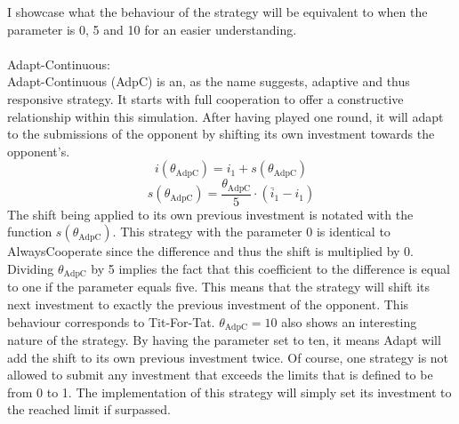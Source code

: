 \documentclass{article}
\begin{document}
\begin{itemize}
I showcase what the behaviour of the strategy will be equivalent to when the parameter is 0, 5 and 10 for an easier understanding.\\
		\\Adapt-Continuous:\\
Adapt-Continuous (AdpC) is an, as the name suggests, adaptive and thus responsive strategy.
It starts with full cooperation to offer a constructive relationship within this simulation.
After having played one round, it will adapt to the submissions of the opponent by shifting its own investment towards the opponent's.
$$i(\theta_{\mathrm{AdpC}}) = i_1 + s(\theta_{\mathrm{AdpC}})$$
$$s(\theta_{\mathrm{AdpC}}) = \frac{\theta_{\mathrm{AdpC}}}{5} \cdot (\bar i_1 - i_1)$$
The shift being applied to its own previous investment is notated with the function $s(\theta_{\mathrm{AdpC}})$.
This strategy with the parameter 0 is identical to AlwaysCooperate since the difference and thus the shift is multiplied by 0.
Dividing $\theta_{\mathrm{AdpC}}$ by 5 implies the fact that this coefficient to the difference is equal to one if the parameter equals five.
This means that the strategy will shift its next investment to exactly the previous investment of the opponent.
This behaviour corresponds to Tit-For-Tat.
$\theta_{\mathrm{AdpC}} = 10$ also shows an interesting nature of the strategy.
By having the parameter set to ten, it means Adapt will add the shift to its own previous investment twice.
Of course, one strategy is not allowed to submit any investment that exceeds the limits that is defined to be from 0 to 1.
The implementation of this strategy will simply set its investment to the reached limit if surpassed.\\

\end{itemize}
\end{document}
